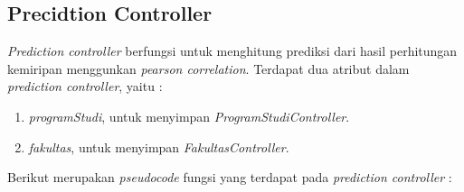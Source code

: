 \subsection{Precidtion Controller}
\label{subsec:prediction}

\textit{Prediction controller} berfungsi untuk menghitung prediksi dari hasil perhitungan kemiripan menggunkan \textit{pearson correlation}. Terdapat dua atribut dalam \textit{prediction controller}, yaitu :

\begin{enumerate}
    \item \textit{programStudi}, untuk menyimpan \textit{ProgramStudiController}.
    
    \item \textit{fakultas}, untuk menyimpan \textit{FakultasController}.
\end{enumerate}

Berikut merupakan \textit{pseudocode} fungsi yang terdapat pada \textit{prediction controller} :

